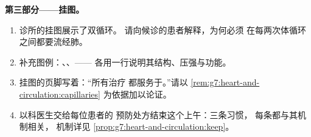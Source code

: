 \begin{problem}
\medskip\noindent\textbf{第三部分——挂图。}
\begin{enumerate}[resume]
  \item 诊所的挂图展示了双循环。
        请向候诊的患者解释，为何必须
        在每两次体循环之间都要流经肺。
  \item 补充图例：、、——
        各用一行说明其结构、压强与功能。
  \item 挂图的页脚写着：“所有治疗
        都服务于。”请以
        \cref{rem:g7:heart-and-circulation:capillaries} 为依据加以论证。
  \item 以科医生交给每位患者的
        预防处方结束这个上午：三条习惯，
        每条都与其机制相关，
        机制详见
        \cref{prop:g7:heart-and-circulation:keep}。
\end{enumerate}
\end{problem}
